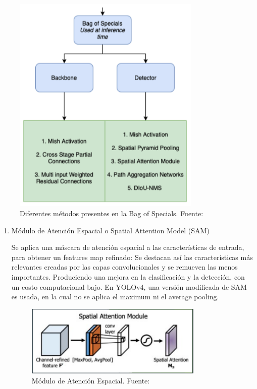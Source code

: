 \begin{figure}[h!]
        \centering
        \includegraphics[width=0.8\textwidth]{img/BagOfSpecials.png}
        \caption{Diferentes métodos presentes en la Bag of Specials. Fuente:\cite{img_bag-of-specials}}
        \label{fig:bag-of-specials}
    \end{figure}

\begin{enumerate}
    \item {Módulo de Atención Espacial o Spatial Attention Model (SAM)}

    Se aplica una máscara de atención espacial a las características de entrada, para obtener un features map refinado: Se destacan así las características más relevantes creadas por las capas convolucionales y se remueven las menos importantes. 
    Produciendo una mejora en la clasificación y la detección, con un costo computacional bajo.
    En YOLOv4, una versión modificada de SAM \cite{yolov4} es usada, en la cual no se aplica el maximum ni el average pooling. 
    \\
    
    \begin{figure}[h!]
        \centering
        \includegraphics[width=0.8\textwidth]{img/SAM.png}
        \caption{Módulo de Atención Espacial. Fuente: \cite{sam1}}
        \label{fig:sam}
    \end{figure}
\end{enumerate}

